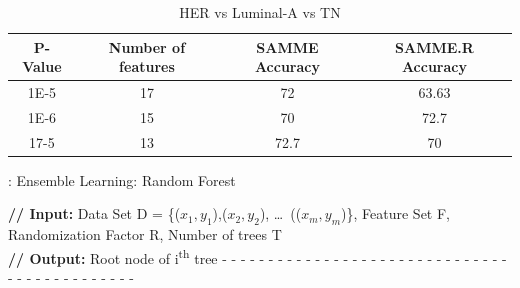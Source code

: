 \documentclass[10pt,journal,compsoc]{IEEEtran}
\begin{document}
\begin{table}[!b]
\centering
\caption{HER vs Luminal-A vs TN}
\label{tb7}
\begin{tabular}{| c | c | c | c |}
\hline
P-Value & Number of features & SAMME Accuracy & SAMME.R Accuracy\\
\hline
1E-5&17&72&63.63\\
\hline
1E-6&15&70&72.7\\
\hline
17-5&13&72.7&70\\
\hline
\end{tabular}
\end{table}

\begin{algorithm}[!t]
\caption{: Ensemble Learning: Random Forest}\label{alg:rf}
\begin{algorithmic}[1]
\footnotesize
\STATE \textbf{// Input:} Data Set D = \{(\(x_1, y_1\)),(\(x_2, y_2\)), \dots\, ((\(x_m, y_m\))\}, Feature Set F, Randomization Factor R, Number of trees T 
\\\textbf{// Output:} Root node of i\textsuperscript{th} tree
\STATE - - - - - - - - - - - - - - - - - - - - - - - - - - - - - - - - - - - - - - - - - - - - -
\ENDIF
{}  
\ENDFOR
\ENDFOR
{}
\end{algorithmic}
\end{algorithm}
\end{document}
